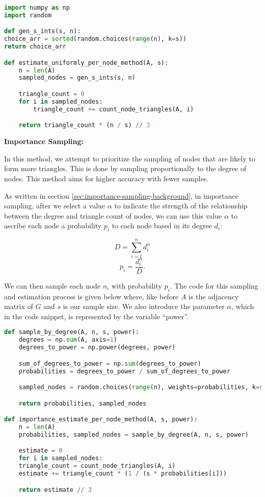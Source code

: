 \documentclass[11pt]{article}
\begin{document}
\begin{lstlisting}[language=Python]
import numpy as np
import random

def gen_s_ints(s, n):
choice_arr = sorted(random.choices(range(n), k=s))
return choice_arr

def estimate_uniformly_per_node_method(A, s):
    n = len(A)
    sampled_nodes = gen_s_ints(s, n)

    triangle_count = 0
    for i in sampled_nodes:
        triangle_count += count_node_triangles(A, i)

    return triangle_count * (n / s) // 3

\end{lstlisting}

\textbf{Importance Sampling:}

In this method, we attempt to prioritize the sampling of nodes that are likely to form more triangles.
This is done by sampling proportionally to the degree of nodes.
This method aims for higher accuracy with fewer samples.


As written in section \ref{sec:importance-sampling-background}, in importance sampling, after we select a value $\alpha$ to indicate the strength of the relationship between the degree and triangle count of nodes, we can use this value $\alpha$ to ascribe each node a probability $p_i$ to each node based in its degree $d_i$:

\[
D = \sum_{i = 1}^{n} d_i^\alpha
\]
\[
p_i = \frac{d_i^\alpha}{D}.
\]

We can then sample each node $n_i$ with probability $p_i$.
The code for this sampling and estimation process is given below where, like before $A$ is the adjacency matrix of $G$ and $s$ is our sample size.
We also introduce the parameter $\alpha$, which in the code snippet, is represented by the variable ``power''.

\begin{lstlisting}[language=Python]
def sample_by_degree(A, n, s, power):
    degrees = np.sum(A, axis=1)
    degrees_to_power = np.power(degrees, power)

    sum_of_degrees_to_power = np.sum(degrees_to_power)
    probabilities = degrees_to_power / sum_of_degrees_to_power

    sampled_nodes = random.choices(range(n), weights=probabilities, k=s)

    return probabilities, sampled_nodes

def importance_estimate_per_node_method(A, s, power):
    n = len(A)
    probabilities, sampled_nodes = sample_by_degree(A, n, s, power)

    estimate = 0
    for i in sampled_nodes:
    triangle_count = count_node_triangles(A, i)
    estimate += triangle_count * (1 / (s * probabilities[i]))

    return estimate // 3
\end{lstlisting}
\end{document}
